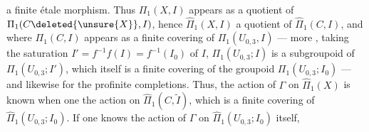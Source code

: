 a finite étale morphism. Thus $\Pi_1(X,I)$ appears as a quotient of $\Pi_1(C\deleted{\unsure{X}},I)$, hence $\widehat\Pi_1(X,I)$ a quotient of $\widehat\Pi_1(C,I)$, and where $\Pi_1(C,I)$ appears as a finite covering of $\Pi_1(U_{0,3},I)$ --- more  , taking the saturation $I'=f^{-1}f(I)=f^{-1}(I_0)$ of $I$, $\Pi_1(U_{0,3};I)$ is a  subgroupoid of $\Pi_1(U_{0,3};I')$, which itself is a finite covering of the groupoid $\Pi_1(U_{0,3};I_0)$ --- and likewise for the profinite completions. Thus, the action of $\Gamma$ on $\widehat\Pi_1(X)$ is known when one \unsure{:} the action on $\widehat\Pi_1(C,\widetilde I)$, which is a finite covering of $\widehat\Pi_1(U_{0,3};I_0)$. If one knows the action of $\Gamma$ on $\widehat\Pi_1(U_{0,3};I_0)$ itself,  
